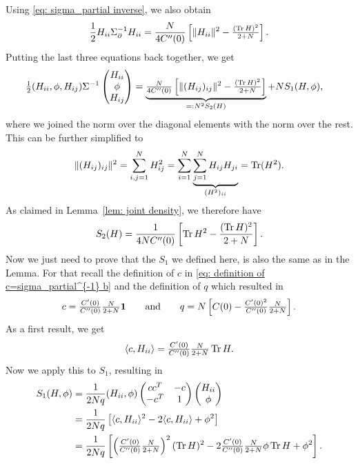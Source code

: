 Using \eqref{eq: sigma_partial inverse}, we also obtain
\[
	\frac12 H_{ii} \Sigma_\partial^{-1} H_{ii}
	= \frac{N}{4C''(0)}
	\left[\|H_{ii}\|^2 - \tfrac{(\operatorname{Tr} H)^2}{2+N}\right].
\]
Putting the last three equations back together, we get
\begin{align*}
		\tfrac12
		( H_{ii},\phi, H_{ij} )\Sigma^{-1}
		\begin{pmatrix}
			H_{ii}\\
			\phi\\
			H_{ij}
		\end{pmatrix}
		&= \underbrace{
			\tfrac{N}{4C''(0)}\left[
			\|(H_{ij})_{ij}\|^2
			- \tfrac{(\operatorname{Tr} H)^2}{2+N}
		\right]
		}_{=: N^2 S_2(H)}
		+ N S_1(H,\phi),
\end{align*}
where we joined the norm over the diagonal elements with the norm over the rest.
This can be further simplified to
\begin{align*}
	\|(H_{ij})_{ij}\|^2 = \sum_{i,j=1}^N H_{ij}^2
	= \sum_{i=1}^N \underbrace{\sum_{j=1}^N H_{ij}H_{ji}}_{(H^2)_{ii}}
	= \operatorname{Tr}(H^2).
\end{align*}
As claimed in Lemma~\ref{lem: joint density}, we therefore have
\[
	S_2(H) = \frac{1}{4 N C''(0)} \left[
		\operatorname{Tr} H^2 - \frac{(\operatorname{Tr} H)^2}{2+N}
	\right].
\]
Now we just need to prove that the \(S_1\) we defined here, is also the same as
in the Lemma. For that recall the definition of \(c\) in \eqref{eq: definition of
c=sigma_partial^{-1} b} and the definition of \(q\) which resulted in
\[
	c=\tfrac{C'(0)}{C''(0)}\tfrac{N}{2+N}\mathbf{1}
	\qquad \text{and} \qquad
	q=N\left[
		C(0) - \tfrac{C'(0)^2}{C''(0)}
		\tfrac{N}{2+N}
	\right].
\]
As a first result, we get
\[
	\langle c, H_{ii}\rangle = 
	\tfrac{C'(0)}{C''(0)}\tfrac{N}{2+N}\operatorname{Tr} H.
\]
Now we apply this to \(S_1\), resulting in
\begin{align*}
	S_1(H, \phi)
	&= \frac{1}{2N q}
	(H_{ii},\phi)
	\begin{pmatrix}
		cc^T & -c \\
		-c^T & 1
	\end{pmatrix}
	\begin{pmatrix}
		H_{ii}\\ \phi
	\end{pmatrix}\\
	&= \frac1{2N q}
	\left[\langle c, H_{ii}\rangle^2 - 2\langle c, H_{ii}\rangle + \phi^2\right]
	\\
	&= \frac1{2N q}
	\left[
		\left(\tfrac{C'(0)}{C''(0)}\tfrac{N}{2+N}\right)^2(\operatorname{Tr} H)^2
		- 2\tfrac{C'(0)}{C''(0)}\tfrac{N}{2+N} \phi\operatorname{Tr} H
		+ \phi^2
	\right].
\end{align*}
